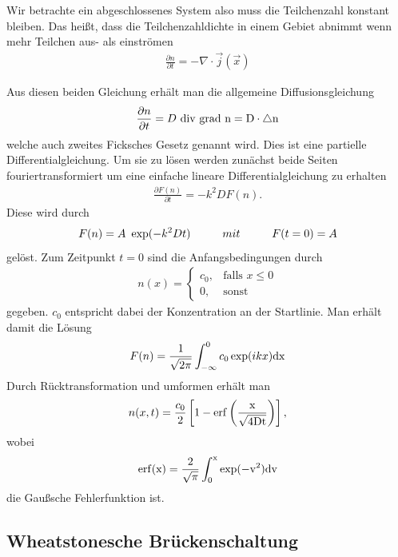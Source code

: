 \documentclass[12pt, a4paper, twoside]{scrartcl}
\begin{document}
\vspace*{0.5cm}
Wir betrachte ein abgeschlossenes System also muss die Teilchenzahl konstant bleiben. Das heißt, dass die Teilchenzahldichte in einem Gebiet abnimmt wenn mehr Teilchen aus- als einströmen
\begin{align*}
\frac{\partial n}{\partial t}=-\nabla\cdot\vec{j}(\vec{x})
\end{align*}

Aus diesen beiden Gleichung erhält man die allgemeine Diffusionsgleichung
\begin{align*}
\frac{\partial n}{\partial t}=D\ \rm{div}\ \rm{grad}\ n=D\cdot\triangle n
\end{align*}
welche auch zweites Ficksches Gesetz genannt wird. Dies ist eine partielle Differentialgleichung. Um sie zu lösen werden zunächst beide Seiten fouriertransformiert um eine einfache lineare Differentialgleichung zu erhalten
\begin{align*}
\frac{\partial F(n)}{\partial t}=-k^2DF(n).
\end{align*}
Diese wird durch
\begin{align*}
F(n)=A\ \exp(-k^2Dt)\hspace*{1.0cm}mit\hspace*{1.0cm} F(t=0)=A
\end{align*}
gelöst.
Zum Zeitpunkt $t=0$ sind die Anfangsbedingungen durch
\begin{align*}
 n(x)=\left\{\begin{array}{cl} c_0, & \mbox{falls }x\leq0\\ 
 					0, & \mbox{sonst} \end{array}\right. 
\end{align*} 
gegeben. $c_0$ entspricht dabei der Konzentration an der Startlinie. Man erhält damit die Lösung
\begin{align*}
F(n)=\frac{1}{\sqrt{2\pi}}\int_{-\infty}^0c_0\exp(ikx)\rm dx
\end{align*}
Durch Rücktransformation und umformen erhält man 
\begin{align}
n(x,t)=\frac{c_0}{2}\left[1-\rm{erf}\left(\frac{x}{\sqrt{4Dt}}\right)\right],
\end{align}
wobei
\begin{align*}
\rm{erf}(x)=\frac{2}{\sqrt{\pi}}\int_0^x\exp(-v^2)dv
\end{align*}
die Gaußsche Fehlerfunktion ist.

\subsection{Wheatstonesche Brückenschaltung}
\end{document}
